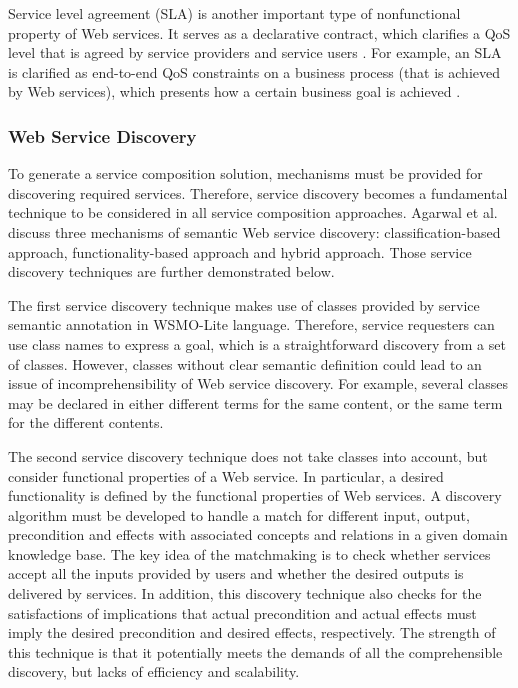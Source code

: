 Service level agreement (SLA) is another important type of nonfunctional property of Web services. It serves as a declarative contract, which clarifies a QoS level that is agreed by service providers and service users \cite{zhao2015toward}. For example,  an SLA is clarified as end-to-end QoS constraints on a business process (that is achieved by Web services),  which presents how a certain business goal is achieved \cite{wada2008multiobjective}.

\subsubsection{Web Service Discovery}\label{servicediscovery}
To generate a service composition solution, mechanisms must be provided for discovering required services. Therefore, service discovery becomes a fundamental technique to be considered in all service composition approaches. Agarwal et al.  \cite{agarwal2009d5} discuss three mechanisms of semantic Web service discovery: classification-based approach, functionality-based approach and hybrid approach. Those service discovery techniques are further demonstrated below.

The first service discovery technique makes use of classes provided by service semantic annotation in WSMO-Lite language. Therefore, service requesters can use class names to express a goal, which is a straightforward discovery from a set of classes. However, classes without clear semantic definition could lead to an issue of incomprehensibility of Web service discovery. For example, several classes may be declared in either different terms for the same content, or the same term for the different contents.

The second service discovery technique  does not take classes into account, but consider functional properties of a Web service. In particular, a desired functionality is defined by the functional properties of Web services. A discovery algorithm must be developed to handle a match for different input, output, precondition and effects with associated concepts and relations in a given domain knowledge base. The key idea of the matchmaking is to check whether services accept all the inputs provided by users and whether the desired outputs is delivered by services. In addition, this discovery technique also checks for the satisfactions of implications that actual precondition and actual effects must imply the desired precondition and desired effects, respectively. The strength of this technique is that it potentially meets the demands of all the comprehensible discovery, but lacks of efficiency and scalability. 

